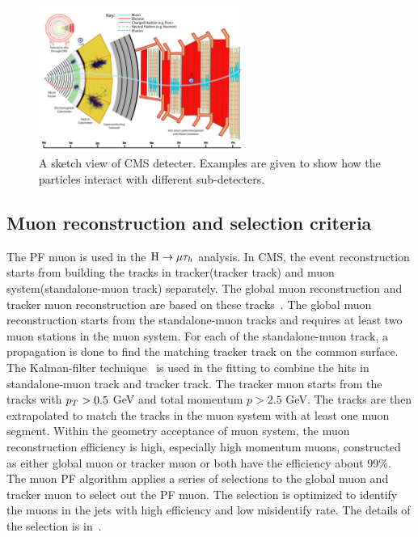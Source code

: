 \begin{figure}[htbp] 
\centering
\includegraphics[width=0.6\textwidth]{chapter4/CMS_detecter_slice.pdf}
\caption{A sketch view of CMS detecter. Examples are given to show how the particles interact with different sub-detecters.}
\label{fig:CMSslice}
\end{figure}



\subsection{Muon reconstruction and selection criteria}

The PF muon is used in the $\mathrm{H}\to \mu\tau_{h}$ analysis. In CMS, the event reconstruction starts from building the tracks in tracker(tracker track) and muon system(standalone-muon track) separately. The global muon reconstruction and tracker muon reconstruction are based on these tracks~\cite{muonreco}. The global muon reconstruction starts from the standalone-muon tracks and requires at least two muon stations in the muon system. For each of the standalone-muon track, a propagation is done to find the matching tracker track on the common surface. The Kalman-filter technique~\cite{Fruhwirth:1987fm} is used in the fitting to combine the hits in standalone-muon track and tracker track. The tracker muon starts from the tracks with $p_{T}>0.5$ GeV and total momentum $p>2.5$ GeV. The tracks are then extrapolated to match the tracks in the muon system with at least one muon segment.  Within the geometry acceptance of muon system, the muon reconstruction efficiency is high, especially high momentum muons, constructed as either global muon or tracker muon or both have the  efficiency about 99\%. The muon PF algorithm applies a series of selections to the global muon and tracker muon to select out the PF muon. The selection is optimized to identify the muons in the jets with high efficiency and low misidentify rate. The details of the selection is in~\cite{PFmuonselection}.   



